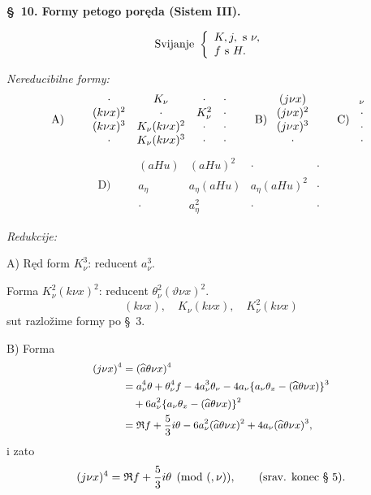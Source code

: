 \documentclass[11pt]{article}
\let\A\relax
\newcommand{\A}{\mathfrak A}
\newcommand{\R}{\mathfrak R}
\newcommand{\hata}{\widehat{a}}
\begin{document}
\begin{center}
\textbf{\S\ 10. \quad Formy petogo poręda (Sistem III).}
\end{center}

\[
\text{Svijanje }\left\{\begin{array}{l}
K,j,\A \text{ s }\nu,\\
f\text{ s }H.
\end{array}\right.
\]

\noindent\textit{Nereducibilne formy:}
\[
\begin{array}{c@{\qquad}c@{\qquad}c@{\qquad}c}
\mathrm{A)} & \begin{array}{cccc}
\cdot&K_\nu&\cdot&\cdot\\
(k\nu x)^2&\cdot&K_\nu^2&\cdot\\
(k\nu x)^3&K_\nu(k\nu x)^2&\cdot&\cdot\\
\cdot&K_\nu(k\nu x)^3&\cdot&\cdot
\end{array}
&
\mathrm{B)}\ \begin{array}{c}(j\nu x)\\(j\nu x)^2\\(j\nu x)^3\\ \cdot\end{array}
&
\mathrm{C)}\ \begin{array}{c}\A_\nu\\\cdot\\\cdot\\\cdot\end{array}
\end{array}
\]
\[
\mathrm{D)}\qquad
\begin{array}{cccc}
(aHu)&(aHu)^2&\cdot&\cdot\\
a_\eta&a_\eta(aHu)&a_\eta(aHu)^2&\cdot\\
\cdot&a_\eta^2&\cdot&\cdot
\end{array}
\]

\noindent\textit{Redukcije:}

\noindent\mbox{A)} Ręd form $K_\nu^3$: reducent $a_\nu^3$.

Forma $K_\nu^2(k\nu x)^2$: reducent $\theta_\nu^2(\vartheta\nu x)^2$.
\[
(k\nu x),\quad K_\nu(k\nu x),\quad K_\nu^2(k\nu x)
\]
sut razložime formy po \S\ 3.

\noindent\mbox{B)} Forma
\[
\begingroup\small
\begin{aligned}
(j\nu x)^4
&=(\hata\theta\nu x)^4\\
&=a_\nu^4\theta+\theta_\nu^4 f-4a_\nu^3\theta_\nu
-4a_\nu\{a_\nu\theta_x-(\hata\theta\nu x)\}^3\\
&\quad+6a_\nu^2\{a_\nu\theta_x-(\hata\theta\nu x)\}^2\\
&=\R f+\frac53 i\theta-6a_\nu^2(\hata\theta\nu x)^2
+4a_\nu(\hata\theta\nu x)^3,
\end{aligned}
\endgroup
\]
i zato
\[
(j\nu x)^4=\R f+\frac53 i\theta\pmod{(\A,\nu)},\qquad
(\text{srav. konec § 5}).
\]
\end{document}
